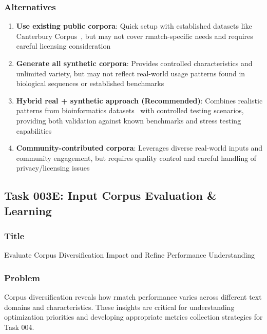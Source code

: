 \documentclass[11pt,a4paper]{article}
\begin{document}
\subsubsection{Alternatives}
\begin{enumerate}
    \item \textbf{Use existing public corpora}: Quick setup with established datasets like Canterbury Corpus~\cite{canterbury_corpus}, but may not cover rmatch-specific needs and requires careful licensing consideration
    \item \textbf{Generate all synthetic corpora}: Provides controlled characteristics and unlimited variety, but may not reflect real-world usage patterns found in biological sequences or established benchmarks
    \item \textbf{Hybrid real + synthetic approach (Recommended)}: Combines realistic patterns from bioinformatics datasets~\cite{durbin1998biological} with controlled testing scenarios, providing both validation against known benchmarks and stress testing capabilities
    \item \textbf{Community-contributed corpora}: Leverages diverse real-world inputs and community engagement, but requires quality control and careful handling of privacy/licensing issues
\end{enumerate}

\subsection{Task 003E: Input Corpus Evaluation \& Learning}

\subsubsection{Title}
Evaluate Corpus Diversification Impact and Refine Performance Understanding

\subsubsection{Problem}
Corpus diversification reveals how rmatch performance varies across different text domains and characteristics. These insights are critical for understanding optimization priorities and developing appropriate metrics collection strategies for Task 004.
\end{document}
